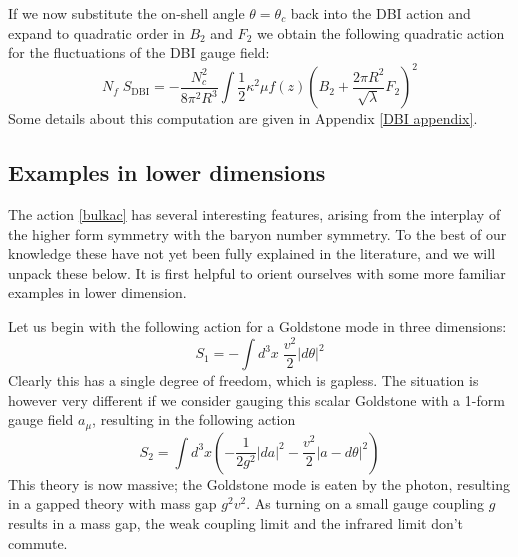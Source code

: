 \documentclass[aps,preprint,nofootinbib,preprintnumbers,eqsecnum,superscriptaddress]{revtex4}
\def\le{\left}
\def\ri{\right}
\begin{document}
If we now substitute the on-shell angle $\theta = \theta_c$ back into the DBI action and expand to quadratic order in $B_2$ and $F_2$ we obtain the following quadratic action for the fluctuations of the DBI gauge field: 		
\begin{equation}
N_f \; S_{\text{DBI}} = -\frac{N_c^2}{8 \pi^2 R^3} \int{\frac{1}{2} \kappa^2 \mu f(z)\left(B_2 + \frac{2 \pi R^2}{\sqrt{\lambda}} F_2 \right)^2}
\end{equation}
Some details about this computation are given in Appendix \ref{DBI appendix}. 
\subsection{Examples in lower dimensions}
The action \eqref{bulkac} has several interesting features, arising from the interplay of the higher form symmetry with the baryon number symmetry. To the best of our knowledge these have not yet been fully explained in the literature, and we will unpack these below. It is first helpful to orient ourselves with some more familiar examples in lower dimension. 

Let us begin with the following action for a Goldstone mode in three dimensions:
\begin{equation}
S_{1} = -\int d^3x \; \frac{v^2}{2} |d\theta|^2 \label{goldstone0form} 
\end{equation}
Clearly this has a single degree of freedom, which is gapless. The situation is however very different if we consider gauging this scalar Goldstone with a 1-form gauge field $a_{\mu}$, resulting in the following action
\begin{equation}
S_{2} = \int d^3x \le(-\frac{1}{2g^2} \left|da\right|^2 - \frac{v^2}{2} \left|a - d\theta\right|^2\ri) \label{higgsed} 
\end{equation}
This theory is now massive; the Goldstone mode is eaten by the photon, resulting in a gapped theory with mass gap $g^2 v^2$. As turning on a small gauge coupling $g$ results in a mass gap, the weak coupling limit and the infrared limit don't commute. 
\end{document}

